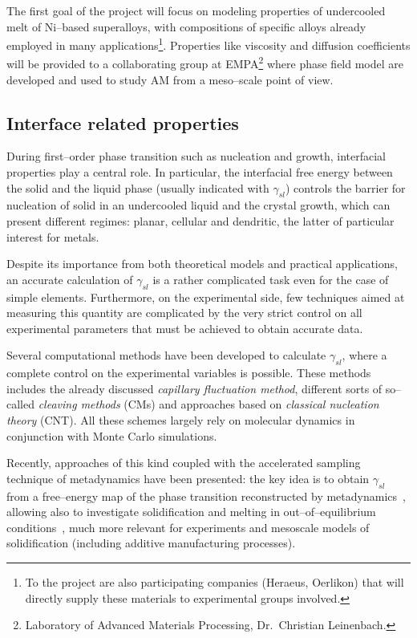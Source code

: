 The first goal of the project will focus on modeling properties of undercooled melt of Ni--based superalloys, with compositions of specific alloys already employed in many applications\footnote{To the project are also participating companies (Heraeus, Oerlikon) that will directly supply these materials to experimental groups involved.}. Properties like viscosity and diffusion coefficients will be provided to a collaborating group at EMPA\footnote{Laboratory of Advanced Materials Processing, Dr.~Christian Leinenbach.} where phase field model are developed and used to study AM from a meso--scale point of view.



\subsection{Interface related properties}
During first--order phase transition such as nucleation and growth, interfacial properties play a central role. In particular, the interfacial free energy between the solid and the liquid phase (usually indicated with $\gamma_{sl}$) controls the barrier for nucleation of solid in an undercooled liquid and the crystal growth, which can present different regimes: planar, cellular and dendritic, the latter of particular interest for metals.

Despite its importance from both theoretical models and practical applications, an accurate calculation of $\gamma_{sl}$ is a rather complicated task even for the case of simple elements. Furthermore, on the experimental side, few techniques aimed at measuring this quantity are complicated by the very strict control on all experimental parameters that must be achieved to obtain accurate data.%

Several computational methods have been developed to calculate $\gamma_{sl}$, where a complete control on the experimental variables is possible. These methods includes the already discussed \emph{capillary fluctuation method}, different sorts of so--called \emph{cleaving methods} (CMs) and approaches based on \emph{classical nucleation theory} (CNT). All these schemes largely rely on molecular dynamics in conjunction with Monte Carlo simulations.

Recently, approaches of this kind coupled with the accelerated sampling technique of metadynamics have been presented: the key idea is to obtain $\gamma_{sl}$ from a free--energy map of the phase transition reconstructed by metadynamics~\cite{Angioletti-Uberti2010}, allowing also to investigate solidification and melting in out--of--equilibrium conditions~\cite{Cheng2015}, much more relevant for experiments and mesoscale models of solidification (including additive manufacturing processes).

